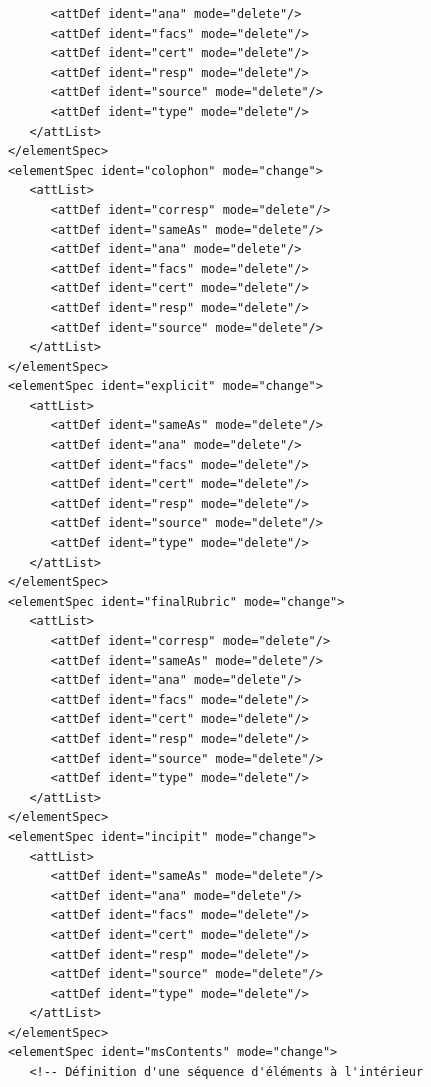 \documentclass[a4paper,12pt,twoside]{book}
\begin{document}
\begin{verbatim}
                  <attDef ident="ana" mode="delete"/>
                  <attDef ident="facs" mode="delete"/>
                  <attDef ident="cert" mode="delete"/>
                  <attDef ident="resp" mode="delete"/>
                  <attDef ident="source" mode="delete"/>
                  <attDef ident="type" mode="delete"/>
               </attList>
            </elementSpec>
            <elementSpec ident="colophon" mode="change">
               <attList>
                  <attDef ident="corresp" mode="delete"/>
                  <attDef ident="sameAs" mode="delete"/>
                  <attDef ident="ana" mode="delete"/>
                  <attDef ident="facs" mode="delete"/>
                  <attDef ident="cert" mode="delete"/>
                  <attDef ident="resp" mode="delete"/>
                  <attDef ident="source" mode="delete"/>
               </attList>
            </elementSpec>
            <elementSpec ident="explicit" mode="change">
               <attList>
                  <attDef ident="sameAs" mode="delete"/>
                  <attDef ident="ana" mode="delete"/>
                  <attDef ident="facs" mode="delete"/>
                  <attDef ident="cert" mode="delete"/>
                  <attDef ident="resp" mode="delete"/>
                  <attDef ident="source" mode="delete"/>
                  <attDef ident="type" mode="delete"/>
               </attList>
            </elementSpec>
            <elementSpec ident="finalRubric" mode="change">
               <attList>
                  <attDef ident="corresp" mode="delete"/>
                  <attDef ident="sameAs" mode="delete"/>
                  <attDef ident="ana" mode="delete"/>
                  <attDef ident="facs" mode="delete"/>
                  <attDef ident="cert" mode="delete"/>
                  <attDef ident="resp" mode="delete"/>
                  <attDef ident="source" mode="delete"/>
                  <attDef ident="type" mode="delete"/>
               </attList>
            </elementSpec>
            <elementSpec ident="incipit" mode="change">
               <attList>
                  <attDef ident="sameAs" mode="delete"/>
                  <attDef ident="ana" mode="delete"/>
                  <attDef ident="facs" mode="delete"/>
                  <attDef ident="cert" mode="delete"/>
                  <attDef ident="resp" mode="delete"/>
                  <attDef ident="source" mode="delete"/>
                  <attDef ident="type" mode="delete"/>
               </attList>
            </elementSpec>
            <elementSpec ident="msContents" mode="change">
               <!-- Définition d'une séquence d'éléments à l'intérieur 

\end{verbatim}
\end{document}
